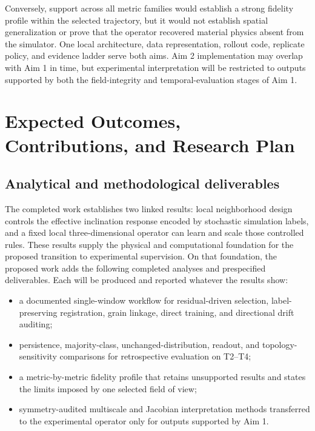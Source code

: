 \documentclass[proposalMode]{ufdissertation}
\begin{document}
Conversely, support across all metric families would establish a strong fidelity profile within the selected trajectory, but it would not establish spatial generalization or prove that the operator recovered material physics absent from the simulator.
One local architecture, data representation, rollout code, replicate policy, and evidence ladder serve both aims. Aim 2 implementation may overlap with Aim 1 in time, but experimental interpretation will be restricted to outputs supported by both the field-integrity and temporal-evaluation stages of Aim 1.


\chapter{Expected Outcomes, Contributions, and Research Plan}

\section{Analytical and methodological deliverables}

The completed work establishes two linked results: local neighborhood design controls the effective inclination response encoded by stochastic simulation labels, and a fixed local three-dimensional operator can learn and scale those controlled rules. These results supply the physical and computational foundation for the proposed transition to experimental supervision. On that foundation, the proposed work adds the following completed analyses and prespecified deliverables. Each will be produced and reported whatever the results show:

\begin{itemize}
\item a documented single-window workflow for residual-driven selection, label-preserving registration, grain linkage, direct training, and directional drift auditing;
\item persistence, majority-class, unchanged-distribution, readout, and topology-sensitivity comparisons for retrospective evaluation on T2--T4;
\item a metric-by-metric fidelity profile that retains unsupported results and states the limits imposed by one selected field of view;
\item symmetry-audited multiscale and Jacobian interpretation methods transferred to the experimental operator only for outputs supported by Aim 1.
\end{itemize}
\end{document}
